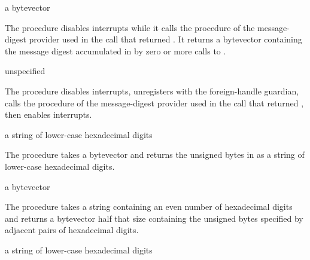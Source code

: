 \begin{procedure}
\end{procedure}
\returns{} a bytevector

The  procedure disables interrupts while it calls the 
procedure of the message-digest provider used in the 
call that returned .
It returns a bytevector containing the message digest accumulated in 
by zero or more calls to .

\begin{procedure}
\end{procedure}
\returns{} unspecified

The  procedure disables interrupts, unregisters 
with the foreign-handle guardian, calls the  procedure of the
message-digest provider used in the  call that returned
, then enables interrupts.

\begin{procedure}
\end{procedure}
\returns{} a string of lower-case hexadecimal digits

The  procedure takes a bytevector  and returns
the unsigned bytes in  as a string of lower-case hexadecimal digits.

\begin{procedure}
\end{procedure}
\returns{} a bytevector

The  procedure takes a string 
containing an even number of hexadecimal digits and returns a
bytevector half that size containing the unsigned bytes
specified by adjacent pairs of hexadecimal digits.

\begin{procedure}
\end{procedure}
\returns{} a string of lower-case hexadecimal digits

